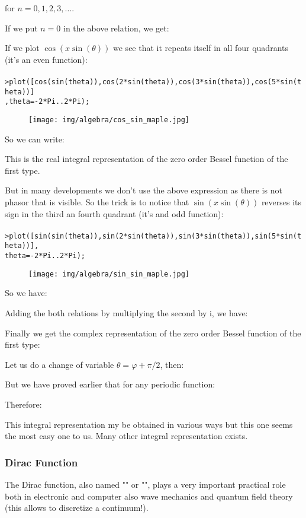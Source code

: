 	for $n=0,1,2,3,\ldots$.
	
	If we put $n=0$ in the above relation, we get:
	
	If we plot $\cos(x\sin(\theta))$ we see that it repeats itself in all four quadrants (it's an even function):\\\\
	\texttt{>plot([cos(sin(theta)),cos(2*sin(theta)),cos(3*sin(theta)),cos(5*sin(theta))]\\
	,theta=-2*Pi..2*Pi);}
	\begin{figure}[H]
		\centering
		\texttt{[image: img/algebra/cos\_sin\_maple.jpg]}
	\end{figure}
	So we can write:
	
	This is the real integral representation of the zero order Bessel function of the first type.
	
	But in many developments we don't use the above expression as there is not phasor that is visible. So the trick is to notice that $\sin(x\sin(\theta))$ reverses its sign in the third an fourth quadrant (it's and odd function):\\\\
		\texttt{>plot([sin(sin(theta)),sin(2*sin(theta)),sin(3*sin(theta)),sin(5*sin(theta))],\\
	theta=-2*Pi..2*Pi);}
	\begin{figure}[H]
		\centering
		\texttt{[image: img/algebra/sin\_sin\_maple.jpg]}
	\end{figure}
	So we have:
	
	Adding the both relations by multiplying the second by $\mathrm{i}$,  we have:
	
	Finally we get the complex representation of the zero order Bessel function of the first type:
	
	
	Let us do a change of variable $\theta=\varphi+\pi/2$, then:
	
	But we have proved earlier that for any periodic function:
	
	Therefore:
	
	This integral representation my be obtained in various ways but this one seems the most easy one to us. Many other integral representation exists.

	\subsubsection{Dirac Function}
	The Dirac function, also named "\label{dirac function}" or "", plays a very important practical role both in electronic and computer also  wave mechanics and quantum field theory (this allows to discretize a continuum!).
	
